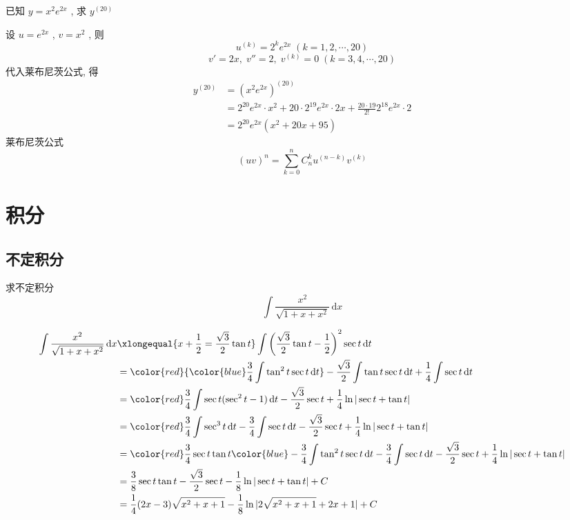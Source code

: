 \documentclass[color=green,titlestyle=hang]{elegantbook}%
\begin{document}
\begin{exercise}  已知 $\displaystyle y=x^2e^{2x}$ , 求 $\displaystyle y^{(20)}$\\[-3mm]
\end{exercise}\begin{Solution}设 $\displaystyle u=e^{2x}$ , $\displaystyle v=x^2$ ,  则
\begin{equation*}u^{(k)}=2^ke^{2x}\;(k=1,2,\cdots,20)\end{equation*}
\begin{equation*}v'=2x,\;v''=2,\;v^{(k)}=0\;(k=3,4,\cdots,20)\end{equation*}
代入莱布尼茨公式, 得\begin{align*}y^{(20)}&=(x^2e^{2x})^{(20)}\\
&=2^{20}e^{2x}\cdot x^2+20\cdot2^{19}e^{2x}\cdot2x+\frac{20\cdot19}{2!}2^{18}e^{2x}\cdot2\\
&=2^{20}e^{2x}(x^2+20x+95)
\end{align*}
莱布尼茨公式\begin{equation*}(uv)^{n}=\sum_{k=0}^{n}C_n^ku^{(n-k)}v^{(k)}\end{equation*}	
\end{Solution}

\chapter{积分}
\section{不定积分}

\begin{exercise}求不定积分\begin{equation*}
	\int\frac{x^2}{\sqrt{1+x+x^2}}\,\mathrm{d}x
	\end{equation*}\end{exercise}	
\begin{Solution} 
\begin{align*}
\int\frac{x^2}{\sqrt{1+x+x^2}}\,\mathrm{d}x
&\xlongequal{x+\frac{1}{2}=\frac{\sqrt{3}}{2}\tan t}\int\left(\frac{\sqrt{3}}{2}\tan t-\frac{1}{2}\right)^2\sec t\,\mathrm{d}t\\
&={\color{red}{\color{blue}\frac{3}{4}\int \tan^2t\sec t \,\mathrm{d}t}}-\frac{\sqrt{3}}{2}\int \tan t\sec t\,\mathrm{d}t+\frac{1}{4}\int \sec t\,\mathrm{d}t\\
&={\color{red}\frac{3}{4}\int \sec t(\sec^2t-1) \,\mathrm{d}t}-\frac{\sqrt{3}}{2}\sec t+\frac{1}{4}\ln|\sec t+\tan t|\\
&={\color{red}\frac{3}{4}\int \sec^3t \,\mathrm{d}t-\frac{3}{4}\int \sec t\,\mathrm{d}t}-\frac{\sqrt{3}}{2}\sec t+\frac{1}{4}\ln|\sec t+\tan t|\\
&={\color{red}\frac{3}{4}\sec t\tan t{\color{blue}-\frac{3}{4}\int \tan^2 t\sec t \,\mathrm{d}t}-\frac{3}{4}\int \sec t\,\mathrm{d}t}-\frac{\sqrt{3}}{2}\sec t+\frac{1}{4}\ln|\sec t+\tan t|\\
&=\frac{3}{8}\sec t\tan t-\frac{\sqrt{3}}{2}\sec t-\frac{1}{8}\ln|\sec t+\tan t|+C\\
&=\frac{1}{4}(2x-3)\sqrt{x^2+x+1}-\frac{1}{8}\ln|2\sqrt{x^2+x+1}+2x+1|+C
\end{align*}		
\end{Solution}
\end{document}
